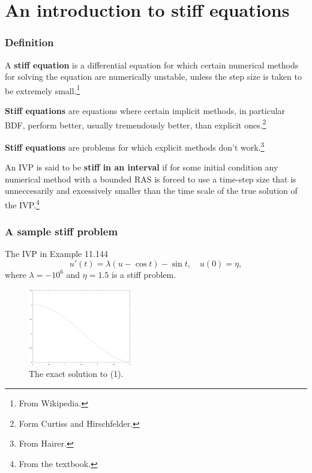 \documentclass[9pt]{beamer}
\begin{document}
\section{An introduction to stiff equations}

\begin{frame}
  \frametitle{Definition}
  A \textbf{stiff equation} is a differential equation for which certain numerical methods for solving the equation are numerically unstable, unless the step size is taken to be extremely small.\footnote{From Wikipedia.}

  \vspace{1em}
  \textbf{Stiff equations} are equations where certain implicit methods, in particular BDF, perform better, usually tremendously better, than explicit ones.\footnote{Form Curtiss and Hirschfelder.}

  \vspace{1em}
  \textbf{Stiff equations} are problems for which explicit methods don't work.\footnote{From Hairer.}

  \vspace{1em}
  An IVP is said to be \textbf{stiff in an interval} if for some initial condition any numerical method with a bounded RAS is forced to use a time-step size that is unneccesarily and excessively smaller than the time scale of the true solution of the IVP.\footnote{From the textbook.}
\end{frame}

\begin{frame}
  \frametitle{A sample stiff problem}
  The IVP in Example 11.144
  \begin{equation}
    u'(t)=\lambda(u-\cos t)-\sin t,\quad u(0)=\eta,
  \end{equation}
  where $\lambda=-10^6$ and $\eta=1.5$ is a stiff problem.

  \begin{figure}
    \centering
    \includegraphics[width=0.4\textwidth]{pic/1-1.eps}
    \caption{The exact solution to (1).}
  \end{figure}
\end{frame}
\end{document}
